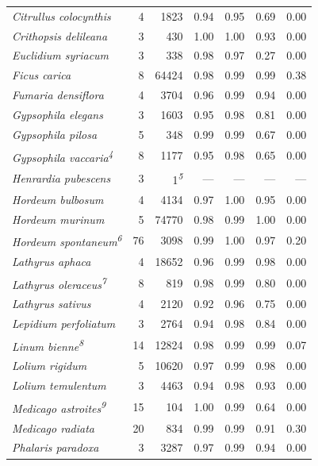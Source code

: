 \documentclass[
  authoryear,
  preprint]{elsarticle}
\begin{document}
\begin{longtable}{@{\extracolsep{\fill}}lrrrrrr}
{\itshape Citrullus colocynthis} & 4 & 1823 & 0.94 & 0.95 & 0.69 & 0.00 \\ 
{\itshape Crithopsis delileana} & 3 & 430 & 1.00 & 1.00 & 0.93 & 0.00 \\ 
{\itshape Euclidium syriacum} & 3 & 338 & 0.98 & 0.97 & 0.27 & 0.00 \\ 
{\itshape Ficus carica} & 8 & 64424 & 0.98 & 0.99 & 0.99 & 0.38 \\ 
{\itshape Fumaria densiflora} & 4 & 3704 & 0.96 & 0.99 & 0.94 & 0.00 \\ 
{\itshape Gypsophila elegans} & 3 & 1603 & 0.95 & 0.98 & 0.81 & 0.00 \\ 
{\itshape Gypsophila pilosa} & 5 & 348 & 0.99 & 0.99 & 0.67 & 0.00 \\ 
{\itshape Gypsophila vaccaria}\textsuperscript{\textit{4}} & 8 & 1177 & 0.95 & 0.98 & 0.65 & 0.00 \\ 
{\itshape Henrardia pubescens} & 3 & 1\textsuperscript{\textit{5}} & — & — & — & — \\ 
{\itshape Hordeum bulbosum} & 4 & 4134 & 0.97 & 1.00 & 0.95 & 0.00 \\ 
{\itshape Hordeum murinum} & 5 & 74770 & 0.98 & 0.99 & 1.00 & 0.00 \\ 
{\itshape Hordeum spontaneum}\textsuperscript{\textit{6}} & 76 & 3098 & 0.99 & 1.00 & 0.97 & 0.20 \\ 
{\itshape Lathyrus aphaca} & 4 & 18652 & 0.96 & 0.99 & 0.98 & 0.00 \\ 
{\itshape Lathyrus oleraceus}\textsuperscript{\textit{7}} & 8 & 819 & 0.98 & 0.99 & 0.80 & 0.00 \\ 
{\itshape Lathyrus sativus} & 4 & 2120 & 0.92 & 0.96 & 0.75 & 0.00 \\ 
{\itshape Lepidium perfoliatum} & 3 & 2764 & 0.94 & 0.98 & 0.84 & 0.00 \\ 
{\itshape Linum bienne}\textsuperscript{\textit{8}} & 14 & 12824 & 0.98 & 0.99 & 0.99 & 0.07 \\ 
{\itshape Lolium rigidum} & 5 & 10620 & 0.97 & 0.99 & 0.98 & 0.00 \\ 
{\itshape Lolium temulentum} & 3 & 4463 & 0.94 & 0.98 & 0.93 & 0.00 \\ 
{\itshape Medicago astroites}\textsuperscript{\textit{9}} & 15 & 104 & 1.00 & 0.99 & 0.64 & 0.00 \\ 
{\itshape Medicago radiata} & 20 & 834 & 0.99 & 0.99 & 0.91 & 0.30 \\ 
{\itshape Phalaris paradoxa} & 3 & 3287 & 0.97 & 0.99 & 0.94 & 0.00 \\ 

\end{longtable}
\end{document}
